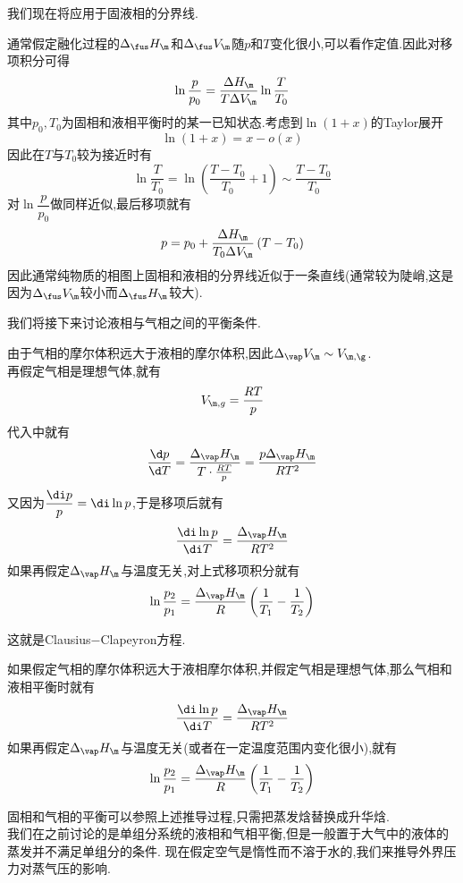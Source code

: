 \documentclass{ctexart}
\begin{document}
我们现在将应用于固液相的分界线.
\begin{derivation}
    通常假定融化过程的$\Delta_\fus H_\m$和$\Delta_\fus V_\m$随$p$和$T$变化很小,可以看作定值.因此对移项积分可得
    \[\ln\dfrac{p}{p_0}=\dfrac{\Delta H_{\m}}{T\Delta V_\m}\ln\dfrac{T}{T_0}\]
    其中$p_0,T_0$为固相和液相平衡时的某一已知状态.考虑到$\ln(1+x)$的Taylor展开
    \[\ln(1+x)=x-o(x)\]
    因此在$T$与$T_0$较为接近时有
    \[\ln\dfrac{T}{T_0}=\ln\left(\dfrac{T-T_0}{T_0}+1\right)\sim\dfrac{T-T_0}{T_0}\]
    对$\ln\dfrac{p}{p_0}$做同样近似,最后移项就有
    \[p=p_0+\dfrac{\Delta H_{\m}}{T_0\Delta V_\m}\left(T-T_0\right)\]
    因此通常纯物质的相图上固相和液相的分界线近似于一条直线(通常较为陡峭,这是因为$\Delta_\fus V_\m$较小而$\Delta_\fus H_\m$较大).
\end{derivation}
\vspace{4pt}
\indent 我们将接下来讨论液相与气相之间的平衡条件.
\begin{derivation}
    由于气相的摩尔体积远大于液相的摩尔体积,因此$\Delta_\vap V_\m\sim V_{\m,\g}$.\\
    再假定气相是理想气体,就有
    \[V_{\m,g}=\dfrac{RT}{p}\]
    代入中就有
    \[\dfrac{\d p}{\d T}=\dfrac{\Delta_\vap H_\m}{T\cdot\frac{RT}{p}}=\dfrac{p\Delta_\vap H_\m}{RT^2}\]
    又因为$\dfrac{\di p}{p}=\di\ln p$,于是移项后就有
    \[\dfrac{\di\ln p}{\di T}=\dfrac{\Delta_\vap H_\m}{RT^2}\]
    如果再假定$\Delta_\vap H_\m$与温度无关,对上式移项积分就有
    \[\ln\dfrac{p_2}{p_1}=\dfrac{\Delta_\vap H_\m}{R}\left(\dfrac1{T_1}-\dfrac1{T_2}\right)\]

\end{derivation}
这就是Clausius$-$Clapeyron方程.
\begin{theorem}
    如果假定气相的摩尔体积远大于液相摩尔体积,并假定气相是理想气体,那么气相和液相平衡时就有
    \[\dfrac{\di\ln p}{\di T}=\dfrac{\Delta_\vap H_\m}{RT^2}\]
    如果再假定$\Delta_\vap H_\m$与温度无关(或者在一定温度范围内变化很小),就有
    \[\ln\dfrac{p_2}{p_1}=\dfrac{\Delta_\vap H_\m}{R}\left(\dfrac1{T_1}-\dfrac1{T_2}\right)\]

\end{theorem}
固相和气相的平衡可以参照上述推导过程,只需把蒸发焓替换成升华焓.\vspace{4pt}\\
\indent 我们在之前讨论的是单组分系统的液相和气相平衡,但是一般置于大气中的液体的蒸发并不满足单组分的条件.%
现在假定空气是惰性而不溶于水的,我们来推导外界压力对蒸气压的影响.
\end{document}
